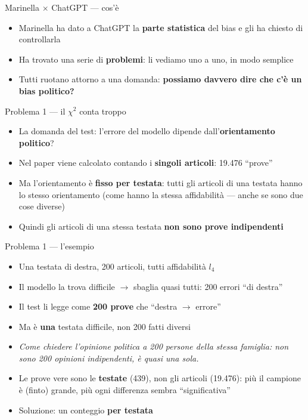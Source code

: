 \documentclass[aspectratio=169]{beamer}
\newcommand{\hl}[1]{\textbf{#1}}
\begin{document}
\begin{frame}{Marinella $\times$ ChatGPT --- cos'\`e}
  \vfill
  \begin{itemize}[<+->]
    \setlength\itemsep{1.0em}
    \item Marinella ha dato a ChatGPT la \hl{parte statistica} del bias e gli ha chiesto di controllarla
    \item Ha trovato una serie di \hl{problemi}: li vediamo uno a uno, in modo semplice
    \item Tutti ruotano attorno a una domanda: \hl{possiamo davvero dire che c'\`e un bias politico?}
  \end{itemize}
  \vfill
\end{frame}

\begin{frame}{Problema 1 --- il $\chi^2$ conta troppo}
  \vfill
  \begin{itemize}[<+->]
    \setlength\itemsep{0.8em}
    \item La domanda del test: l'errore del modello dipende dall'\hl{orientamento politico}?
    \item Nel paper viene calcolato contando i \hl{singoli articoli}: 19.476 ``prove''
    \item Ma l'orientamento \`e \hl{fisso per testata}: tutti gli articoli di una testata hanno lo stesso orientamento (come hanno la stessa affidabilit\`a --- anche se sono due cose diverse)
    \item Quindi gli articoli di una stessa testata \hl{non sono prove indipendenti}
  \end{itemize}
  \vfill
\end{frame}

\begin{frame}{Problema 1 --- l'esempio}
  \vfill
  \begin{itemize}[<+->]
    \setlength\itemsep{0.7em}
    \item Una testata di destra, 200 articoli, tutti affidabilit\`a $l_4$
    \item Il modello la trova difficile $\rightarrow$ sbaglia quasi tutti: 200 errori ``di destra''
    \item Il test li legge come \hl{200 prove} che ``destra $\rightarrow$ errore''
    \item Ma \`e \hl{una} testata difficile, non 200 fatti diversi
    \item[] {\small\itshape Come chiedere l'opinione politica a 200 persone della stessa famiglia: non sono 200 opinioni indipendenti, \`e quasi una sola.}
    \item Le prove vere sono le \hl{testate} (439), non gli articoli (19.476): pi\`u il campione \`e (finto) grande, pi\`u ogni differenza sembra ``significativa''
    \item Soluzione: un conteggio \hl{per testata}
  \end{itemize}
  \vfill
\end{frame}
\end{document}
